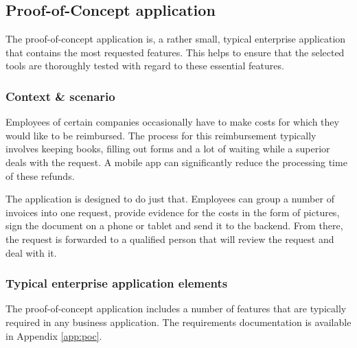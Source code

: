 \subsection{Proof-of-Concept application}
\label{sec:poc}

The proof-of-concept application is, a rather small, typical enterprise application that contains the most requested features. This helps to ensure that the selected tools are thoroughly tested with regard to these essential features. 

\subsubsection{Context \& scenario}

Employees of certain companies occasionally have to make costs for which they would like to be reimbursed. The process for this reimbursement typically involves keeping books, filling out forms and a lot of waiting while a superior deals with the request. A mobile app can significantly reduce the processing time of these refunds.

The application is designed to do just that. Employees can group a number of invoices into one request, provide evidence for the costs in the form of pictures, sign the document on a phone or tablet and send it to the backend. From there, the request is forwarded to a qualified person that will review the request and deal with it. 

\subsubsection{Typical enterprise application elements}

The proof-of-concept application includes a number of features that are typically required in any business application. The requirements documentation is available in Appendix \ref{app:poc}.

